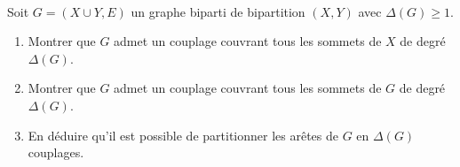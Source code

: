 \begin{td-exo}\,\label{ex:td2ex5}\\ %
	Soit \(G = (X\cup Y, E)\) un graphe biparti de bipartition \((X, Y)\)
	avec \(\Delta(G) \geq 1\).
	\begin{enumerate}
		\item Montrer que \(G\) admet un couplage couvrant tous les sommets de \(X\) de degré \(\Delta(G)\).
		\item Montrer que \(G\) admet un couplage couvrant tous les sommets de \(G\) de degré \(\Delta(G)\).
		\item En déduire qu'il est possible de partitionner les arêtes de \(G\) en \(\Delta(G)\) couplages.
	\end{enumerate}
\end{td-exo}

